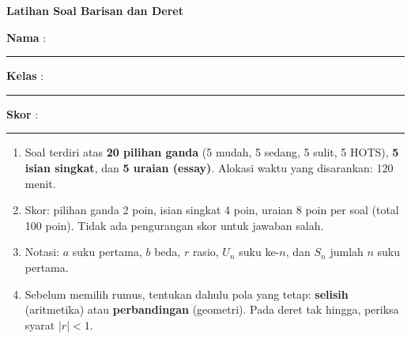 \documentclass[a4paper,11pt]{article}
\newcounter{no}
\begin{document}
\thispagestyle{fancy}

\begin{center}
  {\color{navy}\fontsize{22}{26}\selectfont\bfseries Latihan Soal Barisan dan Deret\par}
\end{center}
\vspace{2pt}
\begin{tcolorbox}[colback=softbg,colframe=navy!40,boxrule=0.6pt,arc=3pt,left=8pt,right=8pt,top=5pt,bottom=5pt]
\noindent\textbf{Nama} : \rule{4.6cm}{0.4pt}\hfill\textbf{Kelas} : \rule{2.2cm}{0.4pt}\hfill\textbf{Skor} : \rule{2.2cm}{0.4pt}
\end{tcolorbox}
\vspace{2pt}
\begin{tcolorbox}[colback=white,colframe=teal,boxrule=0.8pt,arc=3pt,left=8pt,right=8pt,top=4pt,bottom=4pt,title={\bfseries Petunjuk Pengerjaan},coltitle=white,fonttitle=\small]
\small
\begin{enumerate}[leftmargin=1.4em,itemsep=1pt,topsep=1pt]
\item Soal terdiri atas \textbf{20 pilihan ganda} (5 mudah, 5 sedang, 5 sulit, 5 HOTS), \textbf{5 isian singkat}, dan \textbf{5 uraian (essay)}. Alokasi waktu yang disarankan: 120 menit.
\item Skor: pilihan ganda 2 poin, isian singkat 4 poin, uraian 8 poin per soal (total 100 poin). Tidak ada pengurangan skor untuk jawaban salah.
\item Notasi: $a$ suku pertama, $b$ beda, $r$ rasio, $U_n$ suku ke-$n$, dan $S_n$ jumlah $n$ suku pertama.
\item Sebelum memilih rumus, tentukan dahulu pola yang tetap: \textbf{selisih} (aritmetika) atau \textbf{perbandingan} (geometri). Pada deret tak hingga, periksa syarat $|r|<1$.
\end{enumerate}
\end{tcolorbox}
\end{document}
